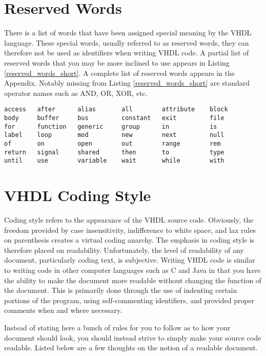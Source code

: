 \section{Reserved Words}
There is a list of words that have been assigned special meaning by the VHDL language. These special words, usually referred to as reserved words, they can therefore not be used as identifiers when writing VHDL code. A partial list of reserved words that you may be more inclined to use appears in Listing \ref{reserved_words_short}. A complete list of reserved words appears in the Appendix. Notably missing from Listing \ref{reserved_words_short} are standard operator names such as AND, OR, XOR, etc.

\begin{lstlisting}[label=reserved_words_short, caption=A short list of VHDL reserved words.]
access   after      alias       all        attribute    block
body     buffer     bus         constant   exit         file
for      function   generic     group      in           is
label    loop       mod         new        next         null
of       on         open        out        range        rem
return   signal     shared      then       to           type
until    use        variable    wait       while        with
\end{lstlisting}


\section{VHDL Coding Style}
Coding style refers to the appearance of the VHDL source code. Obviously, the freedom provided by case insensitivity, indifference to white space, and lax rules on parenthesis creates a virtual coding anarchy. The emphasis in coding style is therefore placed on readability. Unfortunately, the level of readability of any document, particularly coding text, is subjective. Writing VHDL code is similar to writing code in other computer languages such as C and Java in that you have the ability to make the document more readable without changing the function of the document. This is primarily done through the use of indenting certain portions of the program, using self-commenting identifiers, and provided proper comments when and where necessary.

Instead of stating here a bunch of rules for you to follow as to how your document should look, you should instead strive to simply make your source code readable. Listed below are a few thoughts on the notion of a readable document.

